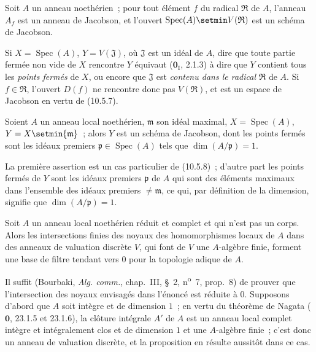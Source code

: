 \begin{corollary}[10.5.8]
\label{IV.10.5.8-fr}
Soit $A$ un anneau noethérien~; pour tout élément $f$ du radical $\mathfrak R$
de $A$, l'anneau $A_f$ est un anneau de Jacobson, et l'ouvert
$\operatorname{Spec}(A)\setmin V(\mathfrak R)$ est un schéma de Jacobson.
\end{corollary}

Si $X=\operatorname{Spec}(A)$, $Y=V(\mathfrak J)$, où $\mathfrak J$ est un
idéal de $A$, dire que toute partie fermée non vide de $X$ rencontre $Y$
équivaut ($\mathbf 0_{\mathrm I}$, 2.1.3) à dire que $Y$ contient tous les
\emph{points fermés} de $X$, ou encore que $\mathfrak J$ est \emph{contenu
dans le radical} $\mathfrak R$ de $A$. Si $f\in\mathfrak R$, l'ouvert $D(f)$
ne rencontre donc pas $V(\mathfrak R)$, et est un espace de Jacobson en vertu
de (10.5.7).

\begin{corollary}[10.5.9]
\label{IV.10.5.9-fr}
Soient $A$ un anneau local noethérien, $\mathfrak m$ son idéal maximal,
$X=\operatorname{Spec}(A)$, $Y=X\setmin\{\mathfrak m\}$~; alors $Y$ est un schéma de
Jacobson, dont les points fermés sont les idéaux premiers
$\mathfrak p\in\operatorname{Spec}(A)$ tels que $\dim(A/\mathfrak p)=1$.
\end{corollary}

La première assertion est un cas particulier de (10.5.8)~; d'autre part les
points fermés de $Y$ sont les idéaux premiers $\mathfrak p$ de $A$ qui sont
des éléments maximaux dans l'ensemble des idéaux premiers $\neq\mathfrak m$,
ce qui, par définition de la dimension, signifie que
$\dim(A/\mathfrak p)=1$.

\begin{proposition}[10.5.10]
\label{IV.10.5.10-fr}
Soit $A$ un anneau local noethérien réduit et complet et qui n'est pas un
corps. Alors les intersections finies des noyaux des homomorphismes locaux de
$A$ dans des anneaux de valuation discrète $V$, qui font de $V$ une
$A$-algèbre finie, forment une base de filtre tendant vers $0$ pour la
topologie adique de $A$.
\end{proposition}

Il suffit (Bourbaki, \emph{Alg. comm.}, chap.~III, \S~2,
n\textsuperscript{o}~7, prop.~8) de prouver que l'intersection des noyaux
envisagés dans l'énoncé est réduite à $0$. Supposons d'abord que $A$ soit
intègre et de dimension $1$~; en vertu du théorème de Nagata ($\mathbf 0$,
23.1.5 et 23.1.6), la clôture intégrale $A'$ de $A$ est un anneau local
complet intègre et
intégralement clos et de dimension $1$ et une $A$-algèbre finie~; c'est donc
un anneau de valuation discrète, et la proposition en résulte aussitôt dans
ce cas.

